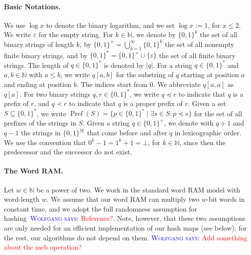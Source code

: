 \documentclass[a4paper,11pt]{article}
\newcommand{\eps}{\varepsilon}
\newcommand{\N}{\mathbb{N}}
\newcommand{\?}{\mskip1.5mu}
\DeclareMathOperator{\Pref}{Pref}
\newcommand{\aremark}[3]{\textcolor{blue}{\textsc{#1 #2:}}
  \textcolor{red}{\textsf{#3}}}
\newcommand{\wolfgang}[2][says]{\aremark{Wolfgang}{#1}{#2}}
\begin{document}
\paragraph{Basic Notations.}
We use $\log x$ to denote the binary logarithm, and we set 
$\log x := 1$, for $x \leq 2$.
We write $\eps$ for the empty string. For $k \in \N$, we denote by 
$\{0, 1\}^k$ the set of all binary strings of length $k$, by 
$\{0,1\}^+ = \bigcup_{k = 1}^{\infty} \{0, 1\}^k$ the set of all
nonempty finite binary strings, and by 
$\{0,1\}^* = \{0, 1\}^+ \cup \{\eps\}$ the set of all finite binary 
strings. The length of $q \in \{0, 1\}^*$ is denoted by $|q|$.
For a string $q \in \{0, 1\}^*$ and $a, b \in \N$ with $a \leq b$, 
we write $q[a, b]$ for the substring of $q$ starting at position
$a$ and ending at position $b$.  The indices start from $0$. 
We abbreviate $q[a, a]$ as $q[a]$. For two binary strings 
$q, r \in \{0,1\}^*$, we write $q \preceq r$ to indicate that $q$ is 
a prefix of $r$, and $q \prec r$ to indicate that $q$ is a proper 
prefix of $r$. 
Given a set $S \subseteq \{0, 1\}^*$, we write 
$\Pref(S) = \{p \in \{0, 1\}^* \mid \exists s \in S: p \preceq s\}$
for the set of all prefixes of the strings in $S$.
Given a string 
$q \in \{0,1\}^+$, we denote with $q + 1$ and $q - 1$ the strings in 
$\{0, 1\}^{|q|}$ that come before and after $q$ in lexicographic 
order. We use the convention that $0^k - 1 = 1^k + 1 = \bot$, for 
$k \in \N$, since then the predecessor and the successor do 
not exist. 

\paragraph{The Word RAM.}
Let $w \in \N$ be a power of two. We work in the standard word RAM 
model with word-length $w$. We assume that our word RAM can multiply
two $w$-bit words in constant time, and we adopt the full 
randomness assumption for hashing~\wolfgang{Reference?}. Note, 
however, that these two assumptions are only needed for an 
efficient implementation of our hash maps (see below);
for the rest, our algorithms do not depend on them.
\wolfgang{Add something about the mcb operation?}
\end{document}
